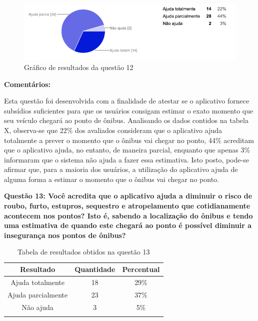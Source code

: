 \begin{figure}[h]
\begin{center}
  \includegraphics[width=15cm]{images/graficos/questao12.png}
  \caption{Gráfico de resultados da questão 12}
  \label{fig:questao12}
\end{center}
\end{figure}

\textbf{Comentários:}

Esta questão foi desenvolvida com a finalidade de atestar se o aplicativo fornece subsídios suficientes para que os usuários consigam estimar o exato momento que seu veículo chegará ao ponto de ônibus. 
Analisando os dados contidos na tabela X, observa-se que 22\% dos avaliados consideram que o aplicativo ajuda totalmente a prever o momento que o ônibus vai chegar no ponto, 44\% acreditam que o aplicativo ajuda, no entanto, de maneira parcial, enquanto que apenas 3\% informaram que o sistema não ajuda a fazer essa estimativa. Isto posto, pode-se afirmar que, para a maioria dos usuários, a utilização do aplicativo ajuda de alguma forma a estimar o momento que o ônibus vai chegar no ponto.\newline

\textbf{Questão 13: Você acredita que o aplicativo ajuda a diminuir o risco de roubo, furto, estupros, sequestro e atropelamento que cotidianamente acontecem nos pontos? Isto é, sabendo a localização do ônibus e tendo uma estimativa de quando este chegará ao ponto é possível diminuir a insegurança nos pontos de ônibus? }

\begin{center}
\begin{longtable}{c|c|c}
\hline
    \multicolumn{1}{c}{\textbf{Resultado}} & \multicolumn{1}{c}{\textbf{Quantidade}} & \multicolumn{1}{c}{\textbf{Percentual}} \\
\hline
    Ajuda totalmente & 18 &  29\%\\
    \hline
    Ajuda parcialmente & 23 & 37\%\\
    \hline
    Não ajuda & 3 &  5\%\\
    \hline

\caption{Tabela de resultados obtidos na questão 13}
\label{tabq13}
\end{longtable}
\end{center}


